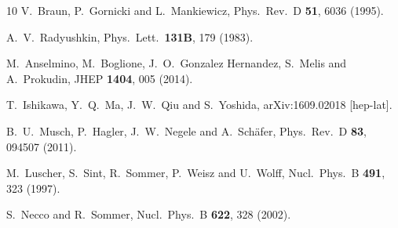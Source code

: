 \begin{thebibliography}{10}
  V.~Braun, P.~Gornicki and L.~Mankiewicz,
  Phys.\ Rev.\ D {\bf 51}, 6036 (1995).

  A.~V.~Radyushkin,
  Phys.\ Lett.\  {\bf 131B}, 179 (1983).
  
  M.~Anselmino, M.~Boglione, J.~O.~Gonzalez Hernandez, S.~Melis and A.~Prokudin,
  JHEP {\bf 1404}, 005 (2014).
  
  T.~Ishikawa, Y.~Q.~Ma, J.~W.~Qiu and S.~Yoshida,
  arXiv:1609.02018 [hep-lat].



  B.~U.~Musch, P.~Hagler, J.~W.~Negele and A.~Sch\"afer,
  Phys.\ Rev.\ D {\bf 83}, 094507 (2011).
  
  M.~Luscher, S.~Sint, R.~Sommer, P.~Weisz and U.~Wolff,
  Nucl.\ Phys.\ B {\bf 491}, 323 (1997).
  
  S.~Necco and R.~Sommer,
  Nucl.\ Phys.\ B {\bf 622}, 328 (2002).





\end{thebibliography}
